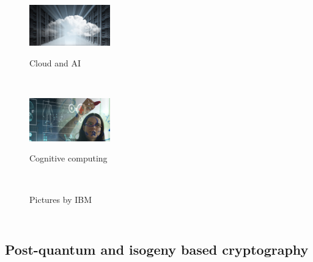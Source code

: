 \documentclass[10pt]{beamer}
\theoremstyle{plain}
\theoremstyle{definition}
\renewcommand{\(}{\left(}
\renewcommand{\)}{\right)}
\begin{document}
\begin{frame}
\begin{columns}[t]

\begin{figure}
\includegraphics[width=3.5cm]
{cloud_and_AI.png} 

Cloud and AI

\vspace{0.1cm}

{\\}

\vspace{0.3cm}

\includegraphics[width=3.5cm]
{cognitive_computing.jpg}

Cognitive computing

\vspace{0.1cm}

{\\}

\vspace{0.05 cm}

{\tiny Pictures by IBM}
\end{figure}
\end{columns}

\end{frame}


\subsection{Post-quantum and isogeny based cryptography}
\end{document}
